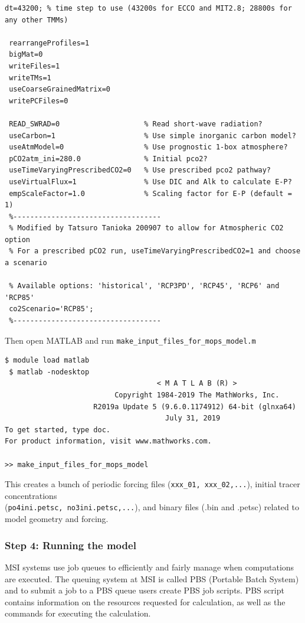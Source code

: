 \documentclass[a4paper]{article}
\def\noin{\noindent }
\begin{document}
\begin{enumerate}
\begin{lstlisting}[frame=single,basicstyle=\scriptsize,commentstyle=\color{blue}]
 dt=43200; % time step to use (43200s for ECCO and MIT2.8; 28800s for any other TMMs)
 
 rearrangeProfiles=1
 bigMat=0
 writeFiles=1
 writeTMs=1
 useCoarseGrainedMatrix=0
 writePCFiles=0
 
 READ_SWRAD=0                    % Read short-wave radiation?
 useCarbon=1                     % Use simple inorganic carbon model?
 useAtmModel=0                   % Use prognostic 1-box atmosphere?
 pCO2atm_ini=280.0               % Initial pco2?
 useTimeVaryingPrescribedCO2=0   % Use prescribed pco2 pathway?
 useVirtualFlux=1                % Use DIC and Alk to calculate E-P?
 empScaleFactor=1.0              % Scaling factor for E-P (default = 1)
 %-----------------------------------
 % Modified by Tatsuro Tanioka 200907 to allow for Atmospheric CO2 option
 % For a prescribed pCO2 run, useTimeVaryingPrescribedCO2=1 and choose a scenario
 
 % Available options: 'historical', 'RCP3PD', 'RCP45', 'RCP6' and 'RCP85'
 co2Scenario='RCP85';
 %-----------------------------------
\end{lstlisting}
\noin Then open MATLAB and run \verb/make_input_files_for_mops_model.m/
\begin{lstlisting}[style=DOS]
 $ module load matlab
 $ matlab -nodesktop
                                    < M A T L A B (R) >
                          Copyright 1984-2019 The MathWorks, Inc.
                     R2019a Update 5 (9.6.0.1174912) 64-bit (glnxa64)
                                      July 31, 2019
To get started, type doc.
For product information, visit www.mathworks.com.

>> make_input_files_for_mops_model
\end{lstlisting}
\noin This creates a bunch of periodic forcing files (\verb|xxx_01, xxx_02,...|), initial tracer concentrations \\ (\verb|po4ini.petsc, no3ini.petsc,...|), and binary files (.bin and .petsc) related to model geometry and forcing.
\end{enumerate}

\subsubsection{Step 4: Running the model}
\noin MSI systems use job queues to efficiently and fairly manage when computations are executed. The queuing system at MSI is called PBS (Portable Batch System) and to submit a job to a PBS queue users create PBS job scripts. PBS script contains information on the resources requested for calculation, as well as the commands for executing the calculation. 
\end{document}
